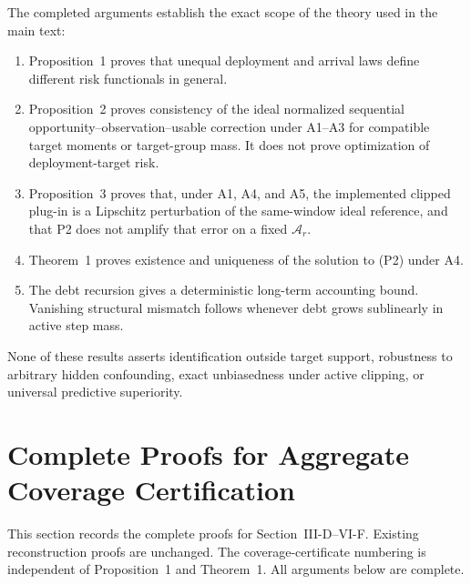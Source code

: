 The completed arguments establish the exact scope of the theory used in
the main text:

\begin{enumerate}
    \item Proposition~1 proves that unequal deployment and arrival laws define
    different risk functionals in general.
    \item Proposition~2 proves consistency of the ideal normalized sequential
    opportunity--observation--usable correction under A1--A3 for compatible
    target moments or target-group mass.  It does not prove optimization of
    deployment-target risk.
    \item Proposition~3 proves that, under A1, A4, and A5, the implemented
    clipped plug-in is a Lipschitz perturbation of the same-window ideal
    reference, and that P2 does not amplify that error on a fixed
    $\mathcal{A}_r$.
    \item Theorem~1 proves existence and uniqueness of the solution to (P2)
    under A4.
    \item The debt recursion gives a deterministic long-term accounting bound.
    Vanishing structural mismatch follows whenever debt grows sublinearly in
    active step mass.
\end{enumerate}

None of these results asserts identification outside target support, robustness
to arbitrary hidden confounding, exact unbiasedness under active clipping, or
universal predictive superiority.


\section{Complete Proofs for Aggregate Coverage Certification}
\label{app:agg_coverage_proofs}

This section records the complete proofs for
Section~\mbox {III-D}--\mbox {VI-F}.
Existing reconstruction proofs are unchanged.  The coverage-certificate
numbering is independent of Proposition~1 and
Theorem~1.  All arguments below are complete.

